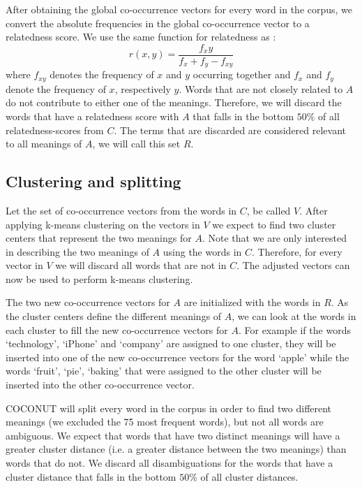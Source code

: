\documentclass[11pt]{article}
\begin{document}
After obtaining the global co-occurrence vectors for every word in the corpus, we convert the absolute frequencies in the global co-occurrence vector to a relatedness score. We use the same function for relatedness as \cite{Guthrie:92}:
$$r(x, y) = \frac{f_xy}{f_x+f_y - f_{xy}}$$
where $f_{xy}$ denotes the frequency of $x$ and $y$ occurring together and $f_x$ and $f_y$ denote the frequency of $x$, respectively $y$. Words that are not closely related to $A$ do not contribute to either one of the meanings. Therefore, we will discard the words that have a relatedness score with $A$ that falls in the bottom $50\%$ of all relatedness-scores from $C$. The terms that are discarded are considered relevant to all meanings of $A$, we will call this set $R$.

\subsection{Clustering and splitting}
Let the set of co-occurrence vectors from the words in $C$, be called $V$. After applying k-means clustering on the vectors in $V$ we expect to find two cluster centers that represent the two meanings for $A$. Note that we are only interested in describing the two meanings of $A$ using the words in $C$. Therefore, for every vector in $V$ we will discard all words that are not in $C$. The adjusted vectors can now be used to perform k-means clustering. 

The two new co-occurrence vectors for $A$ are initialized with the words in $R$. As the cluster centers define the different meanings of $A$, we can look at the words in each cluster to fill the new co-occurrence vectors for $A$. For example if the words `technology', `iPhone' and `company' are assigned to one cluster, they will be inserted into one of the new co-occurrence vectors for the word `apple' while the words `fruit', `pie', `baking' that were assigned to the other cluster will be inserted into the other co-occurrence vector. 

COCONUT will split every word in the corpus in order to find two different meanings (we excluded the 75 most frequent words), but not all words are ambiguous. We expect that words that have two distinct meanings will have a greater cluster distance (i.e. a greater distance between the two meanings) than words that do not. We discard all disambiguations for the words that have a cluster distance that falls in the bottom $50\%$ of all cluster distances.
\end{document}
